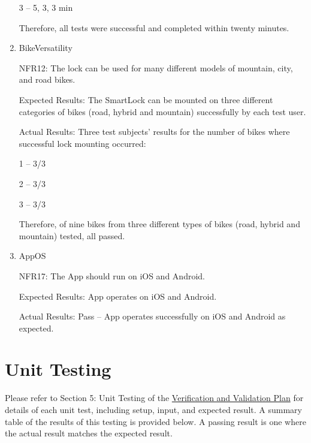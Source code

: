 \documentclass[12pt, titlepage]{article}
\begin{document}
\begin{enumerate}
3 – 5, 3, 3 min 

Therefore, all tests were successful and completed within twenty minutes. 

\item{BikeVersatility

NFR12: The lock can be used for many different models of mountain, city, and road bikes.  }

Expected Results: The SmartLock can be mounted on three different categories of bikes (road, hybrid and mountain) successfully by each test user.  

Actual Results: Three test subjects’ results for the number of bikes where successful lock mounting occurred: 

1 – 3/3 

2 – 3/3 

3 – 3/3 

Therefore, of nine bikes from three different types of bikes (road, hybrid and mountain) tested, all passed. 

\item{AppOS

NFR17: The App should run on iOS and Android.  }

Expected Results: App operates on iOS and Android. 

Actual Results: Pass -- App operates successfully on iOS and Android as expected. 

\end{enumerate}

\section{Unit Testing}

Please refer to Section 5: Unit Testing of the \href{https://github.com/NevoAbigail/Capstone/blob/main/docs/VnVPlan/VnVPlan.pdf}{Verification and Validation Plan} for details of each unit test, including setup, input, and expected result. A summary table of the results of this testing is provided below. A passing result is one where the actual result matches the expected result. 
\end{document}
